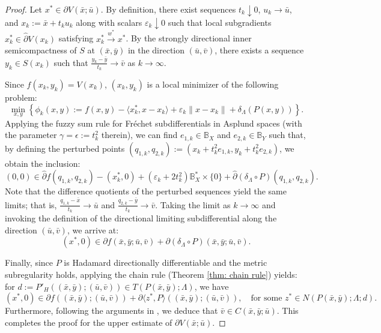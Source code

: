 \documentclass[12pt,twoside,reqno]{amsart}
\theoremstyle{definition}
\numberwithin{equation}{section}
\begin{document}
\begin{proof}
    Let $x^* \in \partial V(\bar{x}; \bar{u})$. By definition, there exist sequences $t_k \downarrow 0$, $u_k \to \bar{u}$, and $x_k := \bar{x} + t_k u_k$ along with scalars $\varepsilon_k \downarrow 0$ such that local subgradients $x_k^* \in \hat{\partial} V(x_k)$ satisfying $x_k^* \xrightarrow{w^*} x^*$. 
    By the strongly directional inner semicompactness of $S$ at $(\bar x,\bar y)$ in the direction $(\bar u,\bar v)$, there exists a sequence $y_k \in S(x_k)$ such that $\frac{y_k - \bar{y}}{t_k} \to \bar{v}$ as $k \to \infty$.  
    
    Since $f(x_k, y_k) = V(x_k)$, $(x_k, y_k)$ is a local minimizer of the following problem:
    \begin{equation*}
        \min_{x, y} \left\{ \phi_k(x, y) := f(x, y) - \langle x_k^*, x - x_k \rangle + \varepsilon_k \|x - x_k\| + \delta_\Lambda(P(x, y)) \right\}.
    \end{equation*}
    Applying the fuzzy sum rule for Fr\'echet subdifferentials in Asplund spaces \cite[Theorem~2.33(b)]{Mordukhovich2006variational} (with the parameter $\gamma=\epsilon := t_k^2$ therein), we can find $e_{1,k} \in \mathbb{B}_X$ and $e_{2,k} \in \mathbb{B}_Y$ such that, by defining the perturbed points $(q_{1,k}, q_{2,k}) := (x_k + t_k^2 e_{1,k}, y_k + t_k^2 e_{2,k})$, we obtain the inclusion:
    \begin{equation*}
        (0, 0) \in \hat{\partial} f(q_{1,k}, q_{2,k}) - (x_k^*, 0) + (\varepsilon_k + 2t_k^2) \mathbb{B}^*_X \times \{0\} + \hat{\partial}(\delta_\Lambda \circ P)(q_{1,k}, q_{2,k}).
    \end{equation*}
    Note that the difference quotients of the perturbed sequences yield the same limits; that is, $\frac{q_{1,k} - \bar{x}}{t_k} \to \bar{u}$ and $\frac{q_{2,k} - \bar{y}}{t_k} \to \bar{v}$. 
    Taking the limit as $k \to \infty$ and invoking the definition of the directional limiting subdifferential along the direction $(\bar{u}, \bar{v})$, we arrive at: 
    \begin{equation*}
        (x^*, 0) \in \partial f(\bar{x}, \bar{y}; \bar{u}, \bar{v}) + \partial(\delta_\Lambda \circ P)(\bar{x}, \bar{y}; \bar{u}, \bar{v}).
    \end{equation*}
    
    Finally, since $P$ is Hadamard directionally differentiable and the metric subregularity holds, applying the chain rule (Theorem \ref{thm: chain rule}) yields: for $d := P'_H((\bar{x}, \bar{y}); (\bar{u}, \bar{v})) \in T(P(\bar{x}, \bar{y});\Lambda)$, we have 
    \begin{equation*}
        (x^*, 0) \in \partial f((\bar{x}, \bar{y}); (\bar{u}, \bar{v})) + \partial \langle z^*, P \rangle((\bar{x}, \bar{y}); (\bar{u}, \bar{v})), \quad \text{for some } z^* \in N(P(\bar{x}, \bar{y}); \Lambda; d).
    \end{equation*}
    Furthermore, following the arguments in \cite[Theorem 3.1(i), Case I]{bai2022directional}, we deduce that $\bar{v} \in C(\bar{x}, \bar{y}; \bar{u})$. This completes the proof for the upper estimate of $\partial V(\bar{x}; \bar{u})$. 
    

\end{proof}
\end{document}

